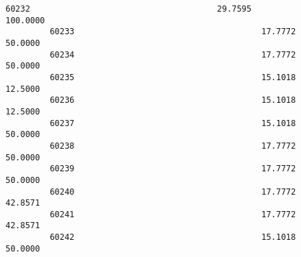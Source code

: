 \documentclass[11pt]{article}
\begin{document}
\begin{Verbatim}[commandchars=\\\{\}]
         60232                                      29.7595                100.0000   
         60233                                      17.7772                 50.0000   
         60234                                      17.7772                 50.0000   
         60235                                      15.1018                 12.5000   
         60236                                      15.1018                 12.5000   
         60237                                      15.1018                 50.0000   
         60238                                      17.7772                 50.0000   
         60239                                      17.7772                 50.0000   
         60240                                      17.7772                 42.8571   
         60241                                      17.7772                 42.8571   
         60242                                      15.1018                 50.0000   
         

\end{Verbatim}
\end{document}
